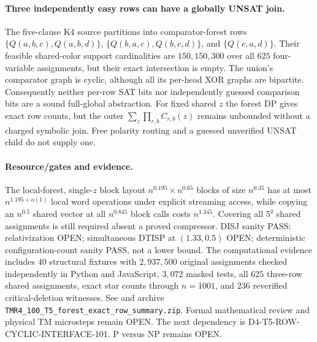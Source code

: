 \documentclass[11pt]{article}
\begin{document}
\paragraph{Three independently easy rows can have a globally UNSAT join.}
The five-clause K4 source partitions into comparator-forest rows
$\{Q(a,b,c),Q(a,b,d)\}$,
$\{Q(b,a,c),Q(b,c,d)\}$, and $\{Q(c,a,d)\}$.
Their feasible shared-color support cardinalities are $150,150,300$
over all $625$ four-variable assignments, but their exact
intersection is empty. The union's comparator graph is cyclic,
although all its per-head XOR graphs are bipartite.
Consequently neither per-row SAT bits nor independently guessed
comparison bits are a sound full-global abstraction.
For fixed shared $z$ the forest DP gives exact row counts, but the
outer $\sum_z\prod_{r,b} C_{r,b}(z)$ remains unbounded without a
charged symbolic join. Free polarity routing and a guessed
unverified UNSAT child do not supply one.

\paragraph{Resource/gates and evidence.}
The local-forest, single-$z$ block layout
$n^{0.195}\times n^{0.65}$ blocks of size $n^{0.35}$
has at most $n^{1.195+o(1)}$ local word operations under
explicit streaming access, while copying an $n^{0.5}$ shared
vector at all $n^{0.845}$ block calls costs $n^{1.345}$.
Covering all $5^q$ shared assignments is still required absent a
proved compressor. DISJ sanity PASS; relativization OPEN;
simultaneous DTISP at $(1.33,0.5)$ OPEN; deterministic
configuration-count sanity PASS, not a lower bound.
The computational evidence includes $40$ structural fixtures with
$2{,}937{,}500$ original assignments checked independently in
Python and JavaScript, $3{,}072$ masked tests, all $625$
three-row shared assignments, exact star counts through $n=1001$,
and $236$ reverified critical-deletion witnesses.
See 
and archive \texttt{TMR4\_100\_T5\_forest\_exact\_row\_summary.zip}.
Formal mathematical review and physical TM microsteps remain OPEN.
The next dependency is D4-T5-ROW-CYCLIC-INTERFACE-101.
P versus NP remains OPEN.
\end{document}
